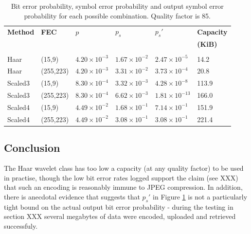 \begin{table}[tbph]
  \begin{center}
        \begin{tabular}{l l l l l l}
            
            \textbf{Method} & \textbf{FEC} & \textbf{$p$} & \textbf{$p_s$} & \textbf{$p_s'$} & \textbf{Capacity} \\  & &  &  &  & \textbf{(KiB)} \\[0.1ex] \hline \\ [-1.5ex]

            Haar & (15,9) & $4.20 \times 10^{-3}$ & $1.67 \times 10^{-2}$ & $2.47 \times 10^{-5}$ & 14.2 \\
            Haar &  (255,223) & $4.20 \times 10^{-3}$ & $3.31 \times 10^{-2}$ & $3.73 \times 10^{-4}$ & 20.8 \\
            Scaled3 & (15,9) & $8.30 \times 10^{-4}$ & $3.32 \times 10^{-3}$ & $4.28 \times 10^{-8}
$ & 113.9 \\
            \rowcolor{green!50!white} Scaled3 & (255,223) & $8.30 \times 10^{-4}$ & $6.62 \times 10^{-3}$ & $1.81 \times 10^{-13}
$ & 166.0 \\
            Scaled4 & (15,9) & $4.49 \times 10^{-2}$ & $1.68 \times 10^{-1}$ & $7.14 \times 10^{-1}$ & 151.9 \\
            Scaled4 & (255,223) & $4.49 \times 10^{-2}$ & $3.08 \times 10^{-1}$ & $3.08
 \times 10^{-1}$ & 221.4 \\
            
        \end{tabular}
        \caption{Bit error probability, symbol error probability and output symbol error probability for each possible combination. Quality factor is 85.}
        \label{tab:fec}
    \end{center}
\end{table}


\subsection{Conclusion}

The Haar wavelet class has too low a capacity (at any quality factor) to be used in practise, though the low bit error rates logged support the claim (see XXX) that such an encoding is reasonably immune to JPEG compression. In addition, there is anecdotal evidence that suggests that $p_s'$ in Figure \ref{tab:fec} is not a particularly tight bound on the actual output bit error probability - during the testing in section XXX several megabytes of data were encoded, uploaded and retrieved successfuly. 

